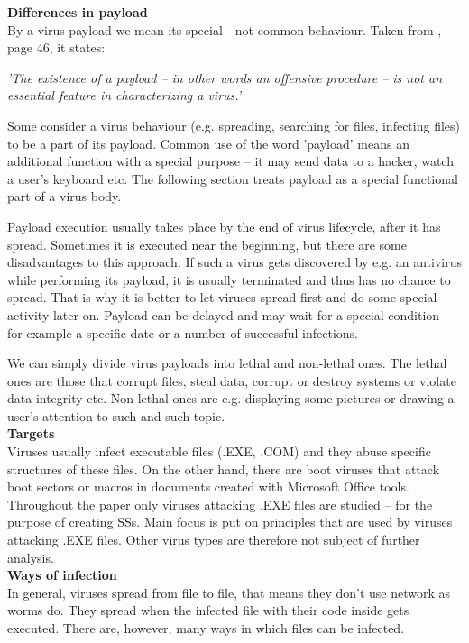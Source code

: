 \documentclass[review]{elsarticle}
\begin{document}
\textbf{Differences in payload}\\
By a virus payload we mean its special - not common behaviour. Taken from \cite{definition}, page 46, it states:
\vspace{5pt}

\textit{'The existence of a payload -- in other words an offensive procedure -- is not an essential feature in characterizing a virus.'}
\vspace{5pt}

Some consider a virus behaviour (e.g. spreading, searching for files, infecting files) to be a part of its payload. Common use of the word 'payload' means an additional function with a special purpose -- it may send data to a hacker, watch a user's keyboard etc. The following section treats payload as a special functional part of a virus body.

\label{ref:payload}
Payload execution usually takes place by the end of virus lifecycle, after it has spread. Sometimes it is executed near the beginning, but there are some disadvantages to this approach. If such a virus gets discovered by e.g. an antivirus while performing its payload, it is usually terminated and thus has no chance to spread. That is why it is better to let viruses spread first and do some special activity later on. \cite{definition} Payload can be delayed and may wait for a special condition -- for example a specific date or a number of successful infections. \cite{definition}

We can simply divide virus payloads into lethal and non-lethal ones. \cite{definition} The lethal ones are those that corrupt files, steal data, corrupt or destroy systems or violate data integrity etc. Non-lethal ones are e.g. displaying some pictures or drawing a user's attention to such-and-such topic. \\

\textbf{Targets}\\
Viruses usually infect executable files (.EXE, .COM) and they abuse specific structures of these files. On the other hand, there are boot viruses that attack boot sectors or macros in documents created with Microsoft Office tools. Throughout the paper only viruses attacking .EXE files are studied -- for the purpose of creating SSs. Main focus is put on principles that are used by viruses attacking .EXE files. Other virus types are therefore not subject of further analysis.\\

\textbf{Ways of infection}\\
In general, viruses spread from file to file, that means they don't use network as worms do. They spread when the infected file with their code inside gets executed. There are, however, many ways in which files can be infected.
\vspace{5pt}
\end{document}
